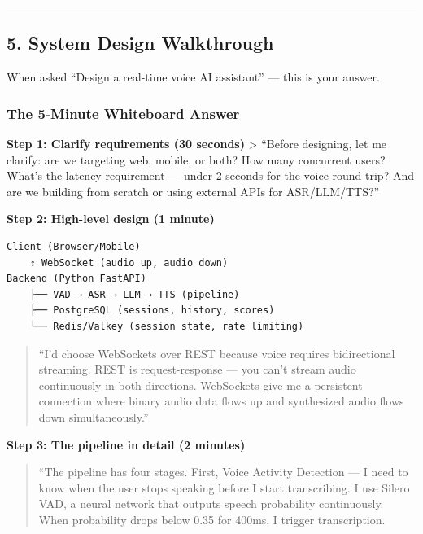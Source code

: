 \documentclass[
  11pt,
]{article}
\begin{document}
\begin{center}\rule{0.5\linewidth}{0.5pt}\end{center}

\hypertarget{system-design-walkthrough}{%
\subsection{5. System Design
Walkthrough}\label{system-design-walkthrough}}

When asked ``Design a real-time voice AI assistant'' --- this is your
answer.

\hypertarget{the-5-minute-whiteboard-answer}{%
\subsubsection{The 5-Minute Whiteboard
Answer}\label{the-5-minute-whiteboard-answer}}

\textbf{Step 1: Clarify requirements (30 seconds)} \textgreater{}
``Before designing, let me clarify: are we targeting web, mobile, or
both? How many concurrent users? What's the latency requirement ---
under 2 seconds for the voice round-trip? And are we building from
scratch or using external APIs for ASR/LLM/TTS?''

\textbf{Step 2: High-level design (1 minute)}

\begin{lstlisting}
Client (Browser/Mobile)
    ↕ WebSocket (audio up, audio down)
Backend (Python FastAPI)
    ├── VAD → ASR → LLM → TTS (pipeline)
    ├── PostgreSQL (sessions, history, scores)
    └── Redis/Valkey (session state, rate limiting)
\end{lstlisting}

\begin{quote}
``I'd choose WebSockets over REST because voice requires bidirectional
streaming. REST is request-response --- you can't stream audio
continuously in both directions. WebSockets give me a persistent
connection where binary audio data flows up and synthesized audio flows
down simultaneously.''
\end{quote}

\textbf{Step 3: The pipeline in detail (2 minutes)}

\begin{quote}
``The pipeline has four stages. First, Voice Activity Detection --- I
need to know when the user stops speaking before I start transcribing. I
use Silero VAD, a neural network that outputs speech probability
continuously. When probability drops below 0.35 for 400ms, I trigger
transcription.
\end{quote}
\end{document}
